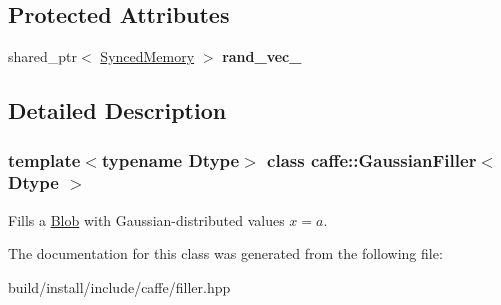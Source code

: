 \subsection*{Protected Attributes}
\begin{DoxyCompactItemize}
\item 
\mbox{\label{classcaffe_1_1_gaussian_filler_a96e640a510cb50ae2eaf1b7bf4f1e28e}} 
shared\+\_\+ptr$<$ \mbox{\hyperlink{classcaffe_1_1_synced_memory}{Synced\+Memory}} $>$ {\bfseries rand\+\_\+vec\+\_\+}
\end{DoxyCompactItemize}


\subsection{Detailed Description}
\subsubsection*{template$<$typename Dtype$>$\newline
class caffe\+::\+Gaussian\+Filler$<$ Dtype $>$}

Fills a \mbox{\hyperlink{classcaffe_1_1_blob}{Blob}} with Gaussian-\/distributed values $ x = a $. 

The documentation for this class was generated from the following file\+:\begin{DoxyCompactItemize}
\item 
build/install/include/caffe/filler.\+hpp\end{DoxyCompactItemize}
